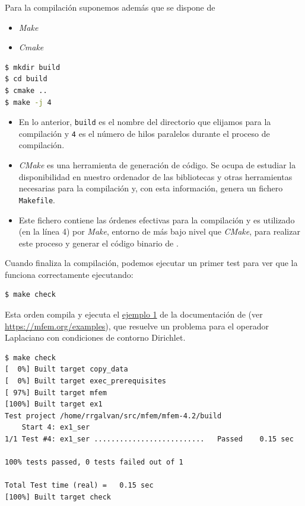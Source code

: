 Para la compilación suponemos además que se dispone de
\begin{itemize}
\item \textit{Make}
\item \textit{Cmake}
\end{itemize}

\begin{lstlisting}[language=sh]
$ mkdir build
$ cd build
$ cmake ..
$ make -j 4
\end{lstlisting}

\begin{itemize}
\item En lo anterior, \texttt{build} es el nombre del directorio que
  elijamos para la compilación y \texttt{4} es el número de hilos
  paralelos durante el proceso de compilación.

\item \textit{CMake} es una
  herramienta de generación de código. Se ocupa de estudiar la
  disponibilidad en nuestro ordenador de las bibliotecas y otras
  herramientas necesarias para la compilación y, con esta información,
  genera un fichero \texttt{Makefile}.

\item Este fichero contiene las órdenes efectivas para la compilación
  y es utilizado (en la línea 4) por \textit{Make}, entorno de más
  bajo nivel que \textit{CMake}, para realizar este proceso y generar
  el código binario de \mfem.
\end{itemize}

Cuando finaliza la compilación, podemos ejecutar un primer test para
ver que la \mfem funciona correctamente ejecutando:
\begin{lstlisting}[language=sh]
$ make check
\end{lstlisting}
Esta orden compila y ejecuta el
\href{https://github.com/mfem/mfem/blob/master/examples/ex1.cpp}{ejemplo
  1} de la documentación de \mfem (ver
\url{https://mfem.org/examples}), que resuelve un problema para el
operador Laplaciano con condiciones de contorno Dirichlet.
\begin{lstlisting}
$ make check
[  0%] Built target copy_data
[  0%] Built target exec_prerequisites
[ 97%] Built target mfem
[100%] Built target ex1
Test project /home/rrgalvan/src/mfem/mfem-4.2/build
    Start 4: ex1_ser
1/1 Test #4: ex1_ser ..........................   Passed    0.15 sec

100% tests passed, 0 tests failed out of 1

Total Test time (real) =   0.15 sec
[100%] Built target check
\end{lstlisting}


